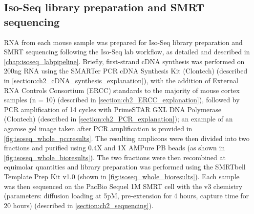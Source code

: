 \subsection{Iso-Seq library preparation and SMRT sequencing}\label{ch4_methods: isoseq_library}
RNA from each mouse sample was prepared for Iso-Seq library preparation and SMRT sequencing following the Iso-Seq lab workflow, as detailed and described in \cref{chap:isoseq_labpipeline}. Briefly, first-strand cDNA synthesis was performed on 200ng RNA using the SMARTer PCR cDNA Synthesis Kit (Clontech) (described in \cref{section:ch2_cDNA_synthesis_explanation}), with the addition of External RNA Controls Consortium (ERCC) standards to the majority of mouse cortex samples (n = 10) (described in \cref{section:ch2_ERCC_explanation}), followed by PCR amplification of 14 cycles with PrimeSTAR GXL DNA Polymerase (Clontech) (described in \cref{section:ch2_PCR_explanation}); an example of an agarose gel image taken after PCR amplification is provided in \cref{fig:isoseq_whole_pccresults}. The resulting amplicons were then divided into two fractions and purified using 0.4X and 1X AMPure PB beads (as shown in \cref{fig:isoseq_whole_bioresults}). The two fractions were then recombined at equimolar quantities and library preparation was performed using the SMRTbell Template Prep Kit v1.0 (shown in \cref{fig:isoseq_whole_bioresults}). Each sample was then sequenced on the PacBio Sequel 1M SMRT cell with the v3 chemistry (parameters: diffusion loading at 5pM, pre-extension for 4 hours, capture time for 20 hours) (described in \cref{section:ch2_sequencing}).

